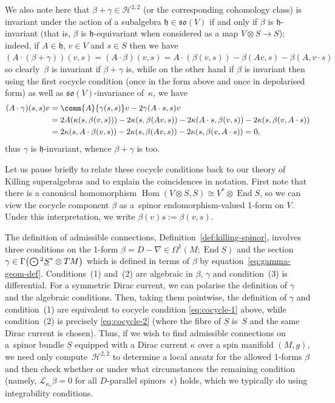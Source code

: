 \documentclass[10pt,a4paper]{amsart}
\numberwithin{equation}{section}
\newcommand{\fh}{\mathfrak{h}}
\newcommand{\fso}{\mathfrak{so}}
\newcommand{\eL}{\mathscr{L}}
\newcommand{\cH}{\mathcal{H}}
\newcommand{\Sbundle}{\underline{S}}
\newcommand{\Odot}{\mathchoice{{\textstyle\bigodot}}{\bigodot}{\bigodot}{\bigodot}}
\newcommand{\1}{\mathbbm{1}}
\DeclareMathOperator{\End}{End}
\DeclareMathOperator{\Hom}{Hom}
\begin{document}
We also note here that $\beta+\gamma\in\cH^{2,2}$ (or the corresponding cohomology class) is invariant under the action of a subalgebra $\fh\in\fso(V)$ if and only if $\beta$ is $\fh$-invariant (that is, $\beta$ is $\fh$-equivariant when considered as a map $V\otimes S\to S$); indeed, if $A\in\fh$, $v\in V$ and $s\in S$ then we have~${(A\cdot(\beta+\gamma))(v,s) = (A\cdot\beta)(v,s) = A\cdot (\beta(v,s)) - \beta(Av,s) - \beta(A,v\cdot s)}
$
so clearly~$\beta$ is invariant if $\beta+\gamma$ is, while on the other hand if $\beta$ is invariant then using the first cocycle condition (once in the form above and once in depolarised form) as well as $\fso(V)$-invariance of~$\kappa$, we have
\begin{align*}
(A\cdot\gamma)(s,s)v &= \comm{A}{\gamma(s,s)}v - 2\gamma(A\cdot s,s)v \\
	&= 2A(\kappa(s,\beta(v,s))) - 2\kappa(s,\beta(Av,s)) - 2\kappa(A\cdot s,\beta(v,s)) - 2\kappa(s,\beta(v,A\cdot s)) \\
	&= 2\kappa(s,A\cdot\beta(v,s)) - 2\kappa(s,\beta(Av,s)) - 2\kappa(s,\beta(v,A\cdot s))= 0,
\end{align*}
thus $\gamma$ is $\fh$-invariant, whence $\beta+\gamma$ is too.

\begin{Remark}
	Let us pause briefly to relate these cocycle conditions back to our theory of Killing superalgebras and to explain the coincidences in notation. First note that there is a canonical homomorphism $\Hom(V\otimes S,S)\cong V^*\otimes\End S$, so we can view the cocycle component $\beta$ as a~spinor endomorphism-valued 1-form on $V$. Under this interpretation, we write $\beta(v)s:=\beta(v,s)$.
	
	The definition of admissible connections, Definition~\ref{def:killing-spinor}, involves three conditions on the 1-form $\beta=D-\nabla\in\Omega^1(M;\End\Sbundle)$ and the section $\gamma\in\Gamma\bigl(\Odot^2\Sbundle^*\otimes TM\bigr)$ which is defined in terms of $\beta$ by equation~\eqref{eq:gamma-geom-def}. Conditions~(1) and~(2) are algebraic in $\beta$, $\gamma$ and condition~(3) is differential. For a symmetric Dirac current, we can polarise the definition of $\gamma$ and the algebraic conditions. Then, taking them pointwise, the definition of $\gamma$ and condition~(1) are equivalent to cocycle condition \eqref{eq:cocycle-1} above, while condition~(2) is precisely \eqref{eq:cocycle-2} (where the fibre of $\Sbundle$ is~$S$ and the same Dirac current is chosen). Thus, if we wish to find admissible connections on a~spinor bundle $\Sbundle$ equipped with a Dirac current $\kappa$ over a spin manifold $(M,g)$, we need only compute~$\cH^{2,2}$ to determine a local ansatz for the allowed 1-forms $\beta$ and then check whether or under what circumstances the remaining condition (namely, $\eL_{\kappa_\epsilon}\beta=0$ for all $D$-parallel spinors~$\epsilon$) holds, which we typically do using integrability conditions.
\end{Remark}
\end{document}

